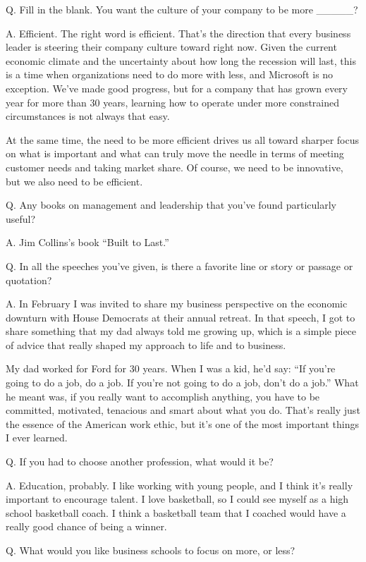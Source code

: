 \documentclass[12pt,a4paper,onecolumn]{article}
\begin{document}
\textsf{Q. Fill in the blank. You want the culture of your company to be more \_\_\_\_\_?}

A. Efficient. The right word is efficient. That's the direction that every business leader is
steering their company culture toward right now. Given the current economic climate and the
uncertainty about how long the recession will last, this is a time when organizations need to do
more with less, and Microsoft is no exception. We've made good progress, but for a company that has
grown every year for more than 30 years, learning how to operate under more constrained
circumstances is not always that easy.

At the same time, the need to be more efficient drives us all toward sharper focus on what is
important and what can truly move the needle in terms of meeting customer needs and taking market
share. Of course, we need to be innovative, but we also need to be efficient.

\textsf{Q. Any books on management and leadership that you've found particularly useful?}

A. Jim Collins's book ``Built to Last.''

\textsf{Q. In all the speeches you've given, is there a favorite line or story or passage or quotation?}

A. In February I was invited to share my business perspective on the economic downturn with House
Democrats at their annual retreat. In that speech, I got to share something that my dad always told
me growing up, which is a simple piece of advice that really shaped my approach to life and to
business.

My dad worked for Ford for 30 years. When I was a kid, he'd say: ``If you're going to do a job, do a
job. If you're not going to do a job, don't do a job.'' What he meant was, if you really want to
accomplish anything, you have to be committed, motivated, tenacious and smart about what you do.
That's really just the essence of the American work ethic, but it's one of the most important things
I ever learned.

\textsf{Q. If you had to choose another profession, what would it be?}

A. Education, probably. I like working with young people, and I think it's really important to
encourage talent. I love basketball, so I could see myself as a high school basketball coach. I
think a basketball team that I coached would have a really good chance of being a winner.

\textsf{Q. What would you like business schools to focus on more, or less?}
\end{document}
